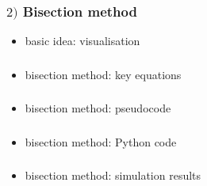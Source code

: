\documentclass[english,14pt]{beamer}
\begin{document}

\begin{frame}[fragile]

\frametitle{$2)$ Bisection method}

\begin{itemize}
	\item basic idea: visualisation
\end{itemize}

\end{frame}


\begin{frame}[fragile]

\frametitle{}

\begin{itemize}
	\item bisection method: key equations
\end{itemize}

\end{frame}


\begin{frame}[fragile]

\frametitle{}

\begin{itemize}
	\item bisection method: pseudocode
\end{itemize}

\end{frame}


\begin{frame}[fragile]

\frametitle{}

\begin{itemize}
	\item bisection method: Python code
\end{itemize}

\end{frame}


\begin{frame}[fragile]

\frametitle{}

\begin{itemize}
	\item bisection method: simulation results
\end{itemize}

\end{frame}
\end{document}
